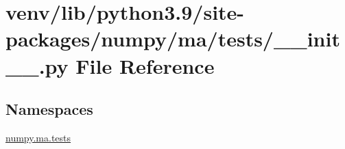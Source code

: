 \hypertarget{venv_2lib_2python3_89_2site-packages_2numpy_2ma_2tests_2____init_____8py}{}\section{venv/lib/python3.9/site-\/packages/numpy/ma/tests/\+\_\+\+\_\+init\+\_\+\+\_\+.py File Reference}
\label{venv_2lib_2python3_89_2site-packages_2numpy_2ma_2tests_2____init_____8py}
\subsection*{Namespaces}
\begin{DoxyCompactItemize}
\item 
 \hyperlink{namespacenumpy_1_1ma_1_1tests}{numpy.\+ma.\+tests}
\end{DoxyCompactItemize}
